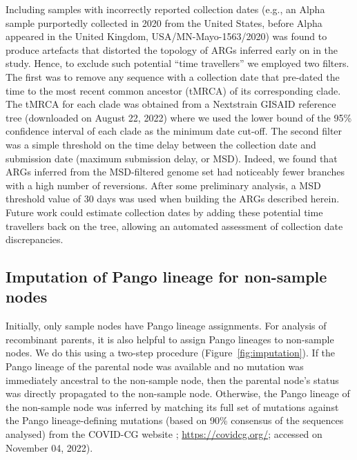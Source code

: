 \documentclass{article}
\begin{document}
Including samples with incorrectly reported collection dates (e.g., an Alpha
sample purportedly collected in 2020 from the United States, before Alpha
appeared in the United Kingdom, USA/MN-Mayo-1563/2020) was found to produce
artefacts that distorted the topology of ARGs inferred early on in the study.
Hence, to exclude such potential ``time travellers'' we employed two filters.
The first was to remove any sequence with a collection date that pre-dated the
time to the most recent common ancestor (tMRCA) of its corresponding clade. The
tMRCA for each clade was obtained from a Nextstrain GISAID reference tree
(downloaded on August 22, 2022) where we used the lower bound of the 95\%
confidence interval of each clade as the minimum date cut-off. The second
filter was a simple threshold on the time delay between the collection date and
submission date (maximum submission delay, or MSD). Indeed, we found that ARGs
inferred from the MSD-filtered genome set had noticeably fewer branches with a
high number of reversions. After some preliminary analysis, a MSD threshold
value of 30 days was used when building the ARGs described herein. Future work
could estimate collection dates by adding these potential time travellers back
on the tree, allowing an automated assessment of collection date discrepancies.

\subsection{Imputation of Pango lineage for non-sample nodes}
Initially, only sample nodes have Pango lineage assignments.
For analysis of recombinant parents, it is also helpful to assign
Pango lineages to non-sample nodes. We do this
using a two-step procedure (Figure~\ref{fig:imputation}). If the Pango
lineage of the parental node was available and no mutation was immediately
ancestral to the non-sample node, then the parental node’s status was directly
propagated to the non-sample node. Otherwise, the Pango lineage of the
non-sample node was inferred by matching its full set of mutations against the
Pango lineage-defining mutations (based on 90\% consensus of the sequences
analysed) from the COVID-CG website \citep{Chen2021-zc};
\url{https://covidcg.org/}; accessed on November 04, 2022).
\end{document}
